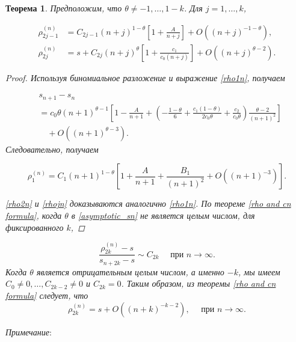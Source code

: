 \documentclass[14pt, a4paper]{extarticle}
\newtheorem{theorem}{Теорема}[section] %
\theoremstyle{definition}
\theoremstyle{remark}
\begin{document}
\begin{theorem}
Предположим, что $\theta \neq-1, \ldots, 1-k$. Для $j=1, \ldots, k$,

\begin{subequations}
    
\begin{align} \label{rhojn}
\rho_{2 j-1}^{(n)} & =C_{2 j-1}(n+j)^{1-\theta}\left[1+\frac{A}{n+j}\right]+O\left((n+j)^{-1-\theta}\right),  \\
\rho_{2 j}^{(n)} & =s+C_{2 j}(n+j)^{\theta}\left[1+\frac{c_{1}}{c_{0}(n+j)}\right]+O\left((n+j)^{\theta-2}\right).
\end{align}
\end{subequations}


\begin{proof}
Используя биномиальное разложение и выражение \eqref{rho1n}, получаем

\begin{align*}
& s_{n+1}-s_{n} \\
& =c_{0} \theta(n+1)^{\theta-1}\left[1-\frac{A}{n+1}+\left(-\frac{1-\theta}{6}+\frac{c_{1}(1-\theta)}{2 c_{0} \theta} +\frac{c_{2}}{c_{0} \theta}\right) \frac{\theta-2}{(n+1)^{2}}\right] \\
& \quad+O\left((n+1)^{\theta-3}\right).
\end{align*}
Следовательно, получаем


\begin{equation*}
\rho_{1}^{(n)}=C_{1}(n+1)^{1-\theta}\left[1+\frac{A}{n+1}+\frac{B_{1}}{(n+1)^{2}}+O\left((n+1)^{-3}\right)\right].
\end{equation*}


\eqref{rho2n} и \eqref{rhojn} доказываются аналогично \eqref{rho1n}.
По теореме \eqref{rho and cn formula}, когда $\theta$ в \eqref{asymptotic_sn} не является целым числом, для фиксированного $k$,
\end{proof}

\begin{equation}
\frac{\rho_{2 k}^{(n)}-s}{s_{n+2 k}-s} \sim C_{2 k} \quad \text { при } n \rightarrow \infty .
\end{equation}
Когда $\theta$ является отрицательным целым числом, а именно $-k$, мы имеем $C_{0} \neq 0, \ldots, C_{2 k-2} \neq 0$ и $C_{2 k}=0$. Таким образом, из теоремы \eqref{rho and cn formula} следует, что
\begin{equation}\label{rho_asymp3}
\rho_{2 k}^{(n)}=s+O\left((n+k)^{-k-2}\right), \quad \text { при } n \rightarrow \infty . 
\end{equation}

\end{theorem}
\textit{Примечание}:
\end{document}
